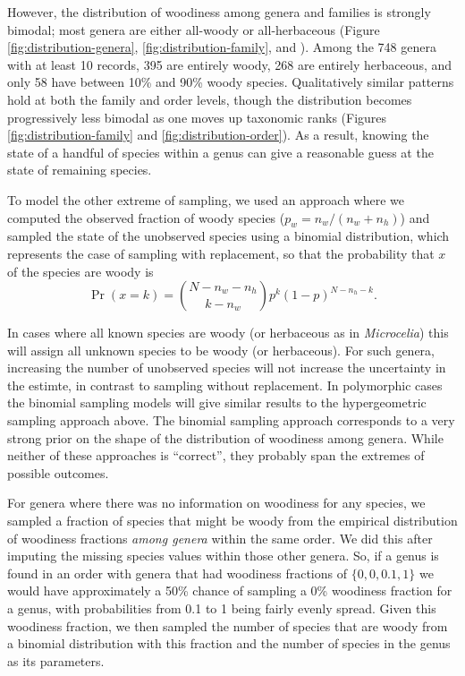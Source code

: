 \documentclass[a4paper,12pt]{article}
\begin{document}
However, the distribution of woodiness among genera and families is
strongly bimodal; most genera are either all-woody or all-herbaceous
(Figure \ref{fig:distribution-genera}, \ref{fig:distribution-family}, and 
\citealt{sinnott1915evolution}).  Among the 748 genera with at least 10
records, 395 are entirely woody, 268 are entirely herbaceous, and only
58 have between 10\% and 90\% woody species. Qualitatively similar patterns
hold at both the family and order levels, though the distribution
becomes progressively less bimodal as one moves up taxonomic ranks 
(Figures \ref{fig:distribution-family} and \ref{fig:distribution-order}). 
As a result, knowing the state of a handful of species within a genus 
can give a reasonable guess at the state of remaining species.

To model the other extreme of sampling, we used an approach where we
computed the observed fraction of woody species ($p_w = n_w / (n_w +
n_h)$) and sampled the state of the unobserved species using a
binomial distribution, which represents the case of sampling
with replacement, so that the probability that $x$ of the species
are woody is
\begin{equation}
  \Pr(x = k) = {N - n_w - n_h \choose k - n_w} 
  p^k (1-p)^{N - n_h - k}.
\end{equation}

In cases where all known species are woody (or herbaceous as in
\textit{Microcelia}) this will assign all unknown species to be woody
(or herbaceous). For such genera, increasing the number of unobserved
species will not increase the uncertainty in the estimte, in contrast
to sampling without replacement.  In polymorphic cases the binomial
sampling models will give similar results to the hypergeometric
sampling approach above. The binomial sampling approach corresponds to
a very strong prior on the shape of the distribution of woodiness
among genera.  While neither of these approaches is ``correct'', they
probably span the extremes of possible outcomes.

For genera where there was no information on woodiness for any
species, we sampled a fraction of species that might be woody from the
empirical distribution of woodiness fractions \textit{among genera}
within the same order. We did this after imputing the missing species
values within those other genera. So, if a genus is found in an order
with genera that had woodiness fractions of $\{0, 0, 0.1, 1\}$ we would
have approximately a 50\% chance of sampling a 0\% woodiness fraction
for a genus, with probabilities from 0.1 to 1 being fairly evenly
spread.  Given this woodiness fraction, we then sampled the number of
species that are woody from a binomial distribution with this fraction
and the number of species in the genus as its parameters.
\end{document}

